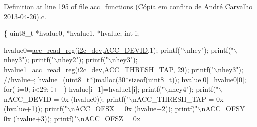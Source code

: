 Definition at line 195 of file acc\-\_\-functions (\-Cópia em conflito de André Carvalho 2013-\/04-\/26).\-c.


\begin{DoxyCode}
\{
  uint8\_t *hvalue0, *hvalue1, *hvalue;
  \textcolor{keywordtype}{int} i;
  
  hvalue0=\hyperlink{group__acc_ga2a91c44eebbe44f4d3b8c508633512f9}{acc\_read\_reg}(\hyperlink{CommunicationV0_2communication_8c_a7751bd45ac1064efb35adf1f19c25db8}{i2c\_dev},\hyperlink{communication_2imu__regs_8h_a007fa8d8ef9d89127ae5da32a2f42283}{ACC\_DEVID},1);
  printf(\textcolor{stringliteral}{"\(\backslash\)nhey"});
  printf(\textcolor{stringliteral}{"\(\backslash\)nhey3"});
  printf(\textcolor{stringliteral}{"\(\backslash\)nhey2"});
  printf(\textcolor{stringliteral}{"\(\backslash\)nhey3"});
  hvalue1=\hyperlink{group__acc_ga2a91c44eebbe44f4d3b8c508633512f9}{acc\_read\_reg}(\hyperlink{CommunicationV0_2communication_8c_a7751bd45ac1064efb35adf1f19c25db8}{i2c\_dev},\hyperlink{communication_2imu__regs_8h_afa5af181c4af31e22baa9bd20ff322ef}{ACC\_THRESH\_TAP},
       29);
  printf(\textcolor{stringliteral}{"\(\backslash\)nhey3"});
  \textcolor{comment}{//hvalue--;}
  hvalue=(uint8\_t*)malloc(30*\textcolor{keyword}{sizeof}(uint8\_t));
  hvalue[0]=hvalue0[0];
  \textcolor{keywordflow}{for}( i=0; i<29; i++)
    hvalue[i+1]=hvalue1[i];
  printf(\textcolor{stringliteral}{"\(\backslash\)nhey4"});
  printf(\textcolor{stringliteral}{"\(\backslash\)nACC\_DEVID = 0x%
      (hvalue0));
  printf(\textcolor{stringliteral}{"\(\backslash\)nACC\_THRESH\_TAP = 0x%
      (hvalue+1));
  printf(\textcolor{stringliteral}{"\(\backslash\)nACC\_OFSX = 0x%
      (hvalue+2));
  printf(\textcolor{stringliteral}{"\(\backslash\)nACC\_OFSY = 0x%
      (hvalue+3));
  printf(\textcolor{stringliteral}{"\(\backslash\)nACC\_OFSZ = 0x%
}}}}}
\end{DoxyCode}

